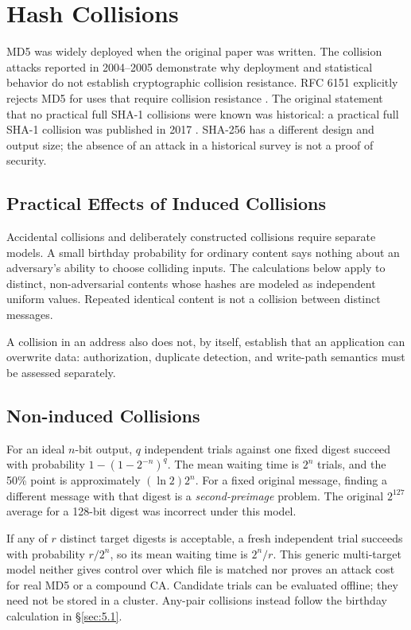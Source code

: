\section{Hash Collisions}\label{sec:4}

MD5 was widely deployed when the original paper was written. The collision
attacks reported in 2004--2005 \cite{ref30,ref31} demonstrate why deployment
and statistical behavior do not establish cryptographic collision resistance. RFC 6151 explicitly rejects MD5 for
uses that require collision resistance \cite{ref35}.
The original statement that no practical full SHA-1 collisions were known
was historical: a practical full SHA-1 collision was published in 2017
\cite{ref34}. SHA-256 has a different design and output size; the absence
of an attack in a historical survey is not a proof of security.

\subsection{Practical Effects of Induced Collisions}\label{sec:4.1}
Accidental collisions and deliberately constructed collisions require
separate models. A small birthday probability for ordinary content says
nothing about an adversary's ability to choose colliding inputs. The
calculations below apply to distinct, non-adversarial contents whose hashes
are modeled as independent uniform values. Repeated identical content is
not a collision between distinct messages.

A collision in an address also does not, by itself, establish that an
application can overwrite data: authorization, duplicate detection, and
write-path semantics must be assessed separately.

\subsection{Non-induced Collisions}\label{sec:4.2}
For an ideal $n$-bit output, $q$ independent trials against one fixed digest
succeed with probability $1-(1-2^{-n})^q$. The mean waiting time is $2^n$
trials, and the 50\% point is approximately $(\ln2)2^n$. For a fixed
original message, finding a different message with that digest is a
\emph{second-preimage} problem. The original $2^{127}$ average for a
128-bit digest was incorrect under this model.

If any of $r$ distinct target digests is acceptable, a fresh independent
trial succeeds with probability $r/2^n$, so its mean waiting time is
$2^n/r$. This generic multi-target model neither gives control over which
file is matched nor proves an attack cost for real MD5 or a compound CA.
Candidate trials can be evaluated offline; they need not be stored in a
cluster. Any-pair collisions instead follow the birthday calculation in
\S\ref{sec:5.1}.
